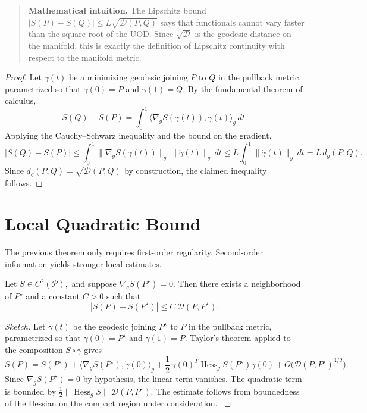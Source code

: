 \begin{quote}
\textbf{Mathematical intuition.}
The Lipschitz bound $|S(P)-S(Q)|\le L\sqrt{\mathcal D(P,Q)}$ says that functionals cannot vary faster than the square root of the UOD.
Since $\sqrt{\mathcal D}$ is the geodesic distance on the manifold, this is exactly the definition of Lipschitz continuity with respect to the manifold metric.
\end{quote}

\begin{proof}
Let \(\gamma(t)\) be a minimizing geodesic joining \(P\) to \(Q\) in the
pullback metric, parametrized so that \(\gamma(0)=P\) and \(\gamma(1)=Q\).
By the fundamental theorem of calculus,
\[
S(Q)-S(P)=\int_0^1 \langle\nabla_g S(\gamma(t)),\dot\gamma(t)\rangle_g\,dt.
\]
Applying the Cauchy--Schwarz inequality and the bound on the gradient,
\[
|S(Q)-S(P)|
\le \int_0^1 \|\nabla_g S(\gamma(t))\|_g\,\|\dot\gamma(t)\|_g\,dt
\le L\int_0^1 \|\dot\gamma(t)\|_g\,dt
= L\,d_g(P,Q).
\]
Since \(d_g(P,Q)=\sqrt{\mathcal D(P,Q)}\) by construction, the
claimed inequality follows.
\end{proof}

\section{Local Quadratic Bound}\label{ch:sec:local-quadratic-bound}
The previous theorem only requires first-order regularity.
Second-order information yields stronger local estimates.
\begin{theorem}
\label{ch:thm:14-2}
Let
$S\in C^{2}(\mathcal P),$
and suppose
$\nabla_gS(P^{\star})=0.$
Then there exists a neighborhood of \(P^{\star}\) and a constant
\(C>0\) such that
\[ \boxed{
|S(P)-S(P^\star)|
\le
C\,\mathcal D(P,P^\star).
} \]
\end{theorem}
\begin{proof}[Sketch]
Let \(\gamma(t)\) be the geodesic joining \(P^{\star}\) to \(P\) in the
pullback metric, parametrized so that \(\gamma(0)=P^{\star}\) and
\(\gamma(1)=P\).  Taylor's theorem applied to the composition
\(S\circ\gamma\) gives
\[
S(P)=S(P^{\star})+\langle\nabla_g S(P^{\star}),\dot\gamma(0)\rangle_g
+\frac12\,\ddot\gamma(0)^T\operatorname{Hess}_g S(P^{\star})\dot\gamma(0)
+O\bigl(\mathcal D(P,P^{\star})^{3/2}\bigr).
\]
Since \(\nabla_g S(P^{\star})=0\) by hypothesis, the linear term vanishes.
The quadratic term is bounded by \(\frac12\|\operatorname{Hess}_g S\|\,
\mathcal D(P,P^{\star})\).  The estimate follows from boundedness of the
Hessian on the compact region under consideration. \(\)
\end{proof}
